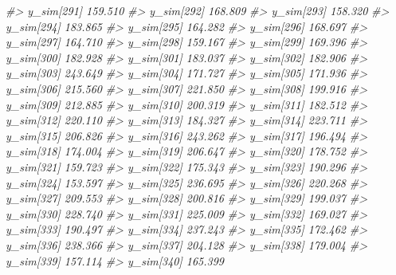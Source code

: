 \documentclass[
  10pt,
  italian,
  a4paper,
  extrafontsizes,onecolumn,openright
  ]{memoir}
\newenvironment{Shaded}{\begin{snugshade}}{\end{snugshade}}
\newcommand{\CommentTok}[1]{\textcolor[rgb]{0.56,0.35,0.01}{\textit{#1}}}
\begin{document}
\begin{Shaded}
\begin{Highlighting}[]
\CommentTok{\#\textgreater{}   y\_sim[291] 159.510}
\CommentTok{\#\textgreater{}   y\_sim[292] 168.809}
\CommentTok{\#\textgreater{}   y\_sim[293] 158.320}
\CommentTok{\#\textgreater{}   y\_sim[294] 183.865}
\CommentTok{\#\textgreater{}   y\_sim[295] 164.282}
\CommentTok{\#\textgreater{}   y\_sim[296] 168.697}
\CommentTok{\#\textgreater{}   y\_sim[297] 164.710}
\CommentTok{\#\textgreater{}   y\_sim[298] 159.167}
\CommentTok{\#\textgreater{}   y\_sim[299] 169.396}
\CommentTok{\#\textgreater{}   y\_sim[300] 182.928}
\CommentTok{\#\textgreater{}   y\_sim[301] 183.037}
\CommentTok{\#\textgreater{}   y\_sim[302] 182.906}
\CommentTok{\#\textgreater{}   y\_sim[303] 243.649}
\CommentTok{\#\textgreater{}   y\_sim[304] 171.727}
\CommentTok{\#\textgreater{}   y\_sim[305] 171.936}
\CommentTok{\#\textgreater{}   y\_sim[306] 215.560}
\CommentTok{\#\textgreater{}   y\_sim[307] 221.850}
\CommentTok{\#\textgreater{}   y\_sim[308] 199.916}
\CommentTok{\#\textgreater{}   y\_sim[309] 212.885}
\CommentTok{\#\textgreater{}   y\_sim[310] 200.319}
\CommentTok{\#\textgreater{}   y\_sim[311] 182.512}
\CommentTok{\#\textgreater{}   y\_sim[312] 220.110}
\CommentTok{\#\textgreater{}   y\_sim[313] 184.327}
\CommentTok{\#\textgreater{}   y\_sim[314] 223.711}
\CommentTok{\#\textgreater{}   y\_sim[315] 206.826}
\CommentTok{\#\textgreater{}   y\_sim[316] 243.262}
\CommentTok{\#\textgreater{}   y\_sim[317] 196.494}
\CommentTok{\#\textgreater{}   y\_sim[318] 174.004}
\CommentTok{\#\textgreater{}   y\_sim[319] 206.647}
\CommentTok{\#\textgreater{}   y\_sim[320] 178.752}
\CommentTok{\#\textgreater{}   y\_sim[321] 159.723}
\CommentTok{\#\textgreater{}   y\_sim[322] 175.343}
\CommentTok{\#\textgreater{}   y\_sim[323] 190.296}
\CommentTok{\#\textgreater{}   y\_sim[324] 153.597}
\CommentTok{\#\textgreater{}   y\_sim[325] 236.695}
\CommentTok{\#\textgreater{}   y\_sim[326] 220.268}
\CommentTok{\#\textgreater{}   y\_sim[327] 209.553}
\CommentTok{\#\textgreater{}   y\_sim[328] 200.816}
\CommentTok{\#\textgreater{}   y\_sim[329] 199.037}
\CommentTok{\#\textgreater{}   y\_sim[330] 228.740}
\CommentTok{\#\textgreater{}   y\_sim[331] 225.009}
\CommentTok{\#\textgreater{}   y\_sim[332] 169.027}
\CommentTok{\#\textgreater{}   y\_sim[333] 190.497}
\CommentTok{\#\textgreater{}   y\_sim[334] 237.243}
\CommentTok{\#\textgreater{}   y\_sim[335] 172.462}
\CommentTok{\#\textgreater{}   y\_sim[336] 238.366}
\CommentTok{\#\textgreater{}   y\_sim[337] 204.128}
\CommentTok{\#\textgreater{}   y\_sim[338] 179.004}
\CommentTok{\#\textgreater{}   y\_sim[339] 157.114}
\CommentTok{\#\textgreater{}   y\_sim[340] 165.399}

\end{Highlighting}
\end{Shaded}
\end{document}
